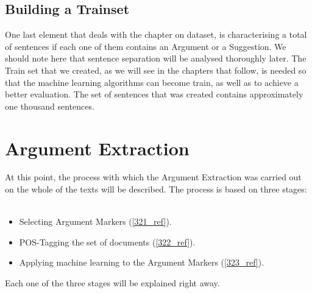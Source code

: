 \subsection{Building a Trainset}\label{315_ref}
One last element that deals with the chapter on dataset, is characterising a total of sentences if each one of them contains an Argument or a Suggestion. We should note here that sentence separation will be analysed thoroughly later. The Train set that we created, as we will see in the chapters that follow, is needed so that the machine learning algorithms can become train, as well as to achieve a better evaluation. The set of sentences that was created contains approximately one thousand sentences.


\section{Argument Extraction}\label{32_ref}
At this point, the process with which the Argument Extraction was carried out on the whole of the texts will be described. The process is based on three stages:\\
\\
\begin{itemize}

	\item Selecting Argument Markers (\ref{321_ref}).
	\item POS-Tagging the set of documents (\ref{322_ref}).
	\item Applying machine learning  to the Argument Markers (\ref{323_ref}).\\

\end{itemize}
Each one of the three stages will be explained right away.

